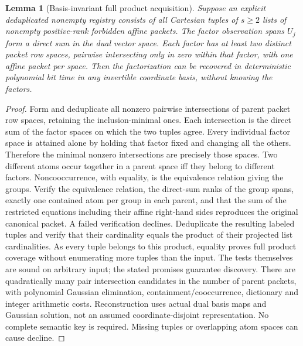 \documentclass[11pt]{article}
\newtheorem{lemma}[theorem]{Lemma}
\begin{document}
\begin{lemma}[Basis-invariant full product acquisition]\label{lem:do19-atoms}
Suppose an explicit deduplicated nonempty registry consists of all Cartesian tuples of $s\ge2$ lists of nonempty positive-rank forbidden affine packets. The factor observation spans $U_j$ form a direct sum in the dual vector space. Each factor has at least two distinct packet row spaces, pairwise intersecting only in zero within that factor, with one affine packet per space. Then the factorization can be recovered in deterministic polynomial bit time in any invertible coordinate basis, without knowing the factors.
\end{lemma}
\begin{proof}
Form and deduplicate all nonzero pairwise intersections of parent packet row spaces, retaining the inclusion-minimal ones. Each intersection is the direct sum of the factor spaces on which the two tuples agree. Every individual factor space is attained alone by holding that factor fixed and changing all the others. Therefore the minimal nonzero intersections are precisely those spaces. Two different atoms occur together in a parent space iff they belong to different factors. Noncooccurrence, with equality, is the equivalence relation giving the groups. Verify the equivalence relation, the direct-sum ranks of the group spans, exactly one contained atom per group in each parent, and that the sum of the restricted equations including their affine right-hand sides reproduces the original canonical packet. A failed verification declines. Deduplicate the resulting labeled tuples and verify that their cardinality equals the product of their projected list cardinalities. As every tuple belongs to this product, equality proves full product coverage without enumerating more tuples than the input. The tests themselves are sound on arbitrary input; the stated promises guarantee discovery. There are quadratically many pair intersection candidates in the number of parent packets, with polynomial Gaussian elimination, containment/cooccurrence, dictionary and integer arithmetic costs. Reconstruction uses actual dual basis maps and Gaussian solution, not an assumed coordinate-disjoint representation. No complete semantic key is required. Missing tuples or overlapping atom spaces can cause decline.
\end{proof}
\end{document}
